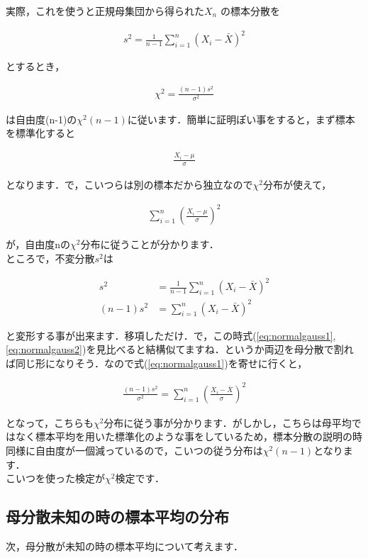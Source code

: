 \documentclass[11pt,a4paper,uplatex]{ujreport} 	%
\begin{document}
実際，これを使うと正規母集団から得られた$X_n$
の標本分散を

\begin{align}
  s^2 = \frac{1}{n-1}\sum_{i=1}^n (X_i - \bar{X})^2
\end{align}

とするとき，

\begin{align}
  \chi^2 = \frac{(n-1)s^2}{\sigma^2}
  \label{eq:chi}
\end{align}

は自由度(n-1)の$\chi^2(n-1)$に従います．簡単に証明ぽい事をすると，まず標本を標準化すると

\begin{align}
  \frac{X_i-\mu}{\sigma}
\end{align}

となります．で，こいつらは別の標本だから独立なので$\chi^2$分布が使えて，

\begin{align}
  \sum_{i=1}^n(\frac{X_i-\mu}{\sigma})^2
  \label{eq:normalgauss2}
\end{align}

が，自由度nの$\chi^2$分布に従うことが分かります．\\

ところで，不変分散$s^2$は

\begin{align}
  s^2 &= \frac{1}{n-1}\sum_{i=1}^n (X_i - \bar{X})^2\\
       (n-1)s^2 &= \sum_{i=1}^n (X_i - \bar{X})^2
      \label{eq:normalgauss1}
\end{align}

と変形する事が出来ます．移項しただけ．で，この時式(\ref{eq:normalgauss1}, \ref{eq:normalgauss2})を見比べると結構似てますね．というか両辺を母分散で割れば同じ形になりそう．なので式(\ref{eq:normalgauss1})を寄せに行くと，

\begin{align}
  \frac{(n-1)s^2}{\sigma^2} =\sum_{i=1}^n (\frac{X_i-\bar{X}}{\sigma})^2
\end{align}

となって，こちらも$\chi^2$分布に従う事が分かります．がしかし，こちらは母平均ではなく標本平均を用いた標準化のような事をしているため，標本分散の説明の時同様に自由度が一個減っているので，こいつの従う分布は$\chi^2(n-1)$となります．\\

こいつを使った検定が$\chi^2$検定です．

\subsection{母分散未知の時の標本平均の分布}
次，母分散が未知の時の標本平均について考えます．\\
\end{document}
